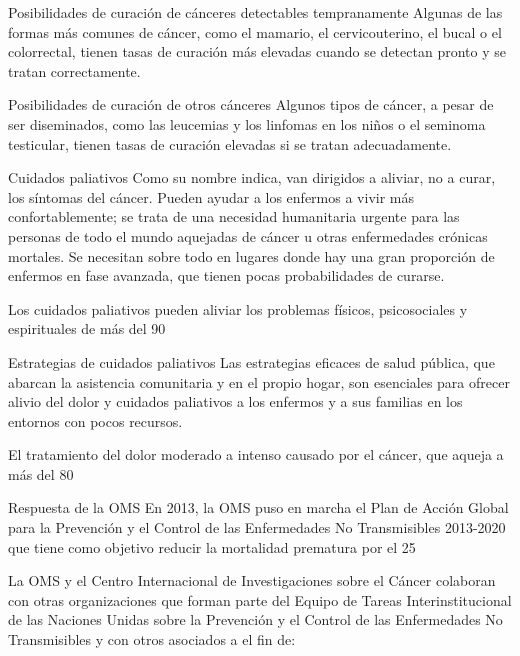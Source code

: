 \documentclass[../pfc.tex]{subfiles}
\begin{document}
Posibilidades de curación de cánceres detectables tempranamente
Algunas de las formas más comunes de cáncer, como el mamario, el cervicouterino, el bucal o el colorrectal, tienen tasas de curación más elevadas cuando se detectan pronto y se tratan correctamente.

Posibilidades de curación de otros cánceres
Algunos tipos de cáncer, a pesar de ser diseminados, como las leucemias y los linfomas en los niños o el seminoma testicular, tienen tasas de curación elevadas si se tratan adecuadamente.

Cuidados paliativos
Como su nombre indica, van dirigidos a aliviar, no a curar, los síntomas del cáncer. Pueden ayudar a los enfermos a vivir más confortablemente; se trata de una necesidad humanitaria urgente para las personas de todo el mundo aquejadas de cáncer u otras enfermedades crónicas mortales. Se necesitan sobre todo en lugares donde hay una gran proporción de enfermos en fase avanzada, que tienen pocas probabilidades de curarse.

Los cuidados paliativos pueden aliviar los problemas físicos, psicosociales y espirituales de más del 90%

Estrategias de cuidados paliativos
Las estrategias eficaces de salud pública, que abarcan la asistencia comunitaria y en el propio hogar, son esenciales para ofrecer alivio del dolor y cuidados paliativos a los enfermos y a sus familias en los entornos con pocos recursos.

El tratamiento del dolor moderado a intenso causado por el cáncer, que aqueja a más del 80%

Respuesta de la OMS
En 2013, la OMS puso en marcha el Plan de Acción Global para la Prevención y el Control de las Enfermedades No Transmisibles 2013-2020 que tiene como objetivo reducir la mortalidad prematura por el 25%

La OMS y el Centro Internacional de Investigaciones sobre el Cáncer colaboran con otras organizaciones que forman parte del Equipo de Tareas Interinstitucional de las Naciones Unidas sobre la Prevención y el Control de las Enfermedades No Transmisibles y con otros asociados a el fin de:
\end{document}

